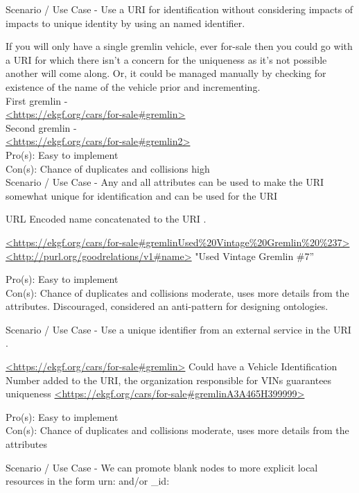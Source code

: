 %
%

Scenario / Use Case -
Use a URI for identification without considering impacts of impacts to unique identity by using an named identifier.

If you will only have a single gremlin vehicle, ever for-sale then you could go with a URI for which there isn’t a
concern for the uniqueness as it’s not possible another will come along.
Or, it could be managed manually by checking for existence of the name of the vehicle prior and incrementing.\\
First gremlin - \\
{\footnotesize\url{<https://ekgf.org/cars/for-sale#gremlin>}}\\
Second gremlin - \\
{\footnotesize\url{<https://ekgf.org/cars/for-sale#gremlin2>}} \\
Pro(s): Easy to implement \\
Con(s): Chance of duplicates and collisions high \\

Scenario / Use Case -
Any and all attributes can be used to make the URI somewhat unique for identification and can be used for the URI

URL Encoded name concatenated to the URI .

    {\footnotesize\url{<https://ekgf.org/cars/for-sale#gremlinUsed%20Vintage%20Gremlin%20%237>} \\ \url{<http://purl.org/goodrelations/v1#name>} "Used Vintage Gremlin \#7”}

Pro(s): Easy to implement \\
Con(s): Chance of duplicates and collisions moderate, uses more details from the attributes.
Discouraged, considered an anti-pattern for designing ontologies.

Scenario / Use Case -
Use a unique identifier from an external service in the URI .

    {\footnotesize\url{<https://ekgf.org/cars/for-sale#gremlin>}}
Could have a Vehicle Identification Number added to the URI, the organization responsible for VINs guarantees uniqueness
    {\footnotesize\url{<https://ekgf.org/cars/for-sale#gremlinA3A465H399999>}}


Pro(s): Easy to implement \\
Con(s): Chance of duplicates and collisions moderate, uses more details from the attributes


Scenario / Use Case -
We can promote blank nodes to more explicit local resources in the form urn: and/or \_id:

